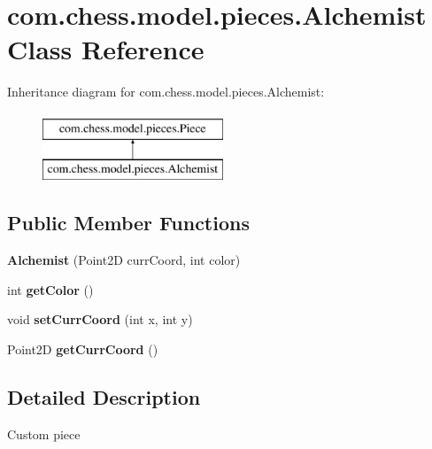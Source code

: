 \hypertarget{classcom_1_1chess_1_1model_1_1pieces_1_1_alchemist}{}\section{com.\+chess.\+model.\+pieces.\+Alchemist Class Reference}
\label{classcom_1_1chess_1_1model_1_1pieces_1_1_alchemist}
Inheritance diagram for com.\+chess.\+model.\+pieces.\+Alchemist\+:\begin{figure}[H]
\begin{center}
\leavevmode
\includegraphics[height=2.000000cm]{classcom_1_1chess_1_1model_1_1pieces_1_1_alchemist}
\end{center}
\end{figure}
\subsection*{Public Member Functions}
\begin{DoxyCompactItemize}
\item 
\mbox{\label{classcom_1_1chess_1_1model_1_1pieces_1_1_alchemist_a4626911d8fa90ca86888ebf0371603a9}} 
{\bfseries Alchemist} (Point2D curr\+Coord, int color)
\item 
\mbox{\label{classcom_1_1chess_1_1model_1_1pieces_1_1_alchemist_aa6cb0c7c18378fb918e6b58707dc7f02}} 
int {\bfseries get\+Color} ()
\item 
\mbox{\label{classcom_1_1chess_1_1model_1_1pieces_1_1_alchemist_a4f2e1982299fe1b6c1d87f5b665a53af}} 
void {\bfseries set\+Curr\+Coord} (int x, int y)
\item 
\mbox{\label{classcom_1_1chess_1_1model_1_1pieces_1_1_alchemist_a8cab56d4ebbc83616a4a1e0091ff9dda}} 
Point2D {\bfseries get\+Curr\+Coord} ()
\end{DoxyCompactItemize}


\subsection{Detailed Description}
Custom piece

